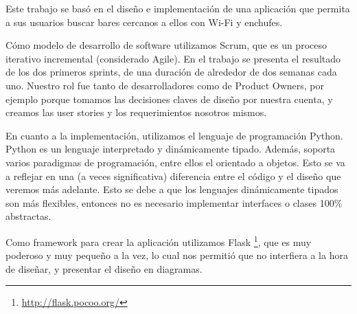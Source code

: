 
Este trabajo se basó en el diseño e implementación de una aplicación que permita a sus usuarios buscar bares cercanos a ellos con Wi-Fi y enchufes.

Cómo modelo de desarrollo de software utilizamos Scrum, que es un proceso iterativo incremental (considerado Agile). En el trabajo se presenta el resultado de los dos primeros sprints, de una duración de alrededor de dos semanas cada uno. Nuestro rol fue tanto de desarrolladores como de Product Owners, por ejemplo porque tomamos las decisiones claves de diseño por nuestra cuenta, y creamos las user stories y los requerimientos nosotros mismos.

En cuanto a la implementación, utilizamos el lenguaje de programación Python. Python es un lenguaje interpretado y dinámicamente tipado. Además, soporta varios paradigmas de programación, entre ellos el orientado a objetos. Esto se va a reflejar en una (a veces significativa) diferencia entre el código y el diseño que veremos más adelante. Esto se debe a que los lenguajes dinámicamente tipados son más flexibles, entonces no es necesario implementar interfaces o clases 100\%
abstractas.

  Como framework para crear la aplicación utilizamos Flask \footnote{\url{http://flask.pocoo.org/}}, que es muy poderoso y muy pequeño a la vez, lo cual nos permitió que no interfiera a la hora de diseñar, y presentar el diseño en diagramas.






